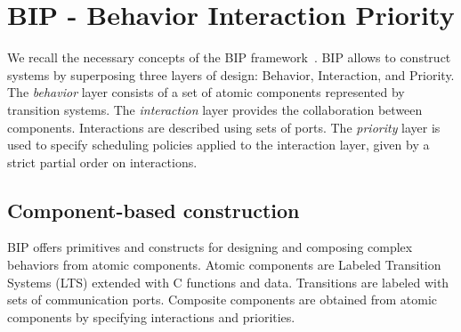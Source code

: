 \section{BIP - Behavior Interaction Priority}
\label{sec:bip}
%
We recall the necessary concepts of the BIP framework~\cite{bip11}.
BIP allows to construct systems by superposing three layers of design: Behavior, Interaction, and Priority.
The \emph{behavior} layer consists of a set of atomic components represented by transition systems. 
The \emph{interaction} layer provides the collaboration between components. 
Interactions are described using sets of ports. 
The \emph{priority} layer is used to specify scheduling policies applied to the interaction layer, given by a strict partial order on interactions.
%
\subsection{Component-based construction}
%
BIP offers primitives and constructs for designing and composing complex behaviors from atomic components. Atomic components are Labeled Transition Systems (LTS) extended with C functions and data. Transitions are labeled with sets of communication ports. 
Composite components are obtained from atomic components by specifying interactions and priorities.
%
%
